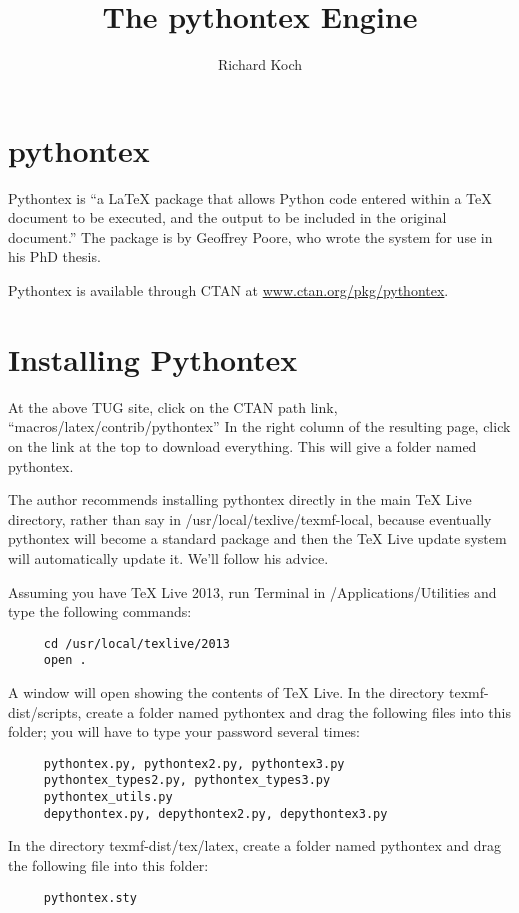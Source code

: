 \documentclass[11pt, oneside]{amsart}
\title{The pythontex Engine}
\author{Richard Koch}
\begin{document}
\maketitle
\vspace{-.3in}
\section{pythontex}
Pythontex is ``a LaTeX package that allows Python code entered within a TeX document to be
executed, and the output to be included in the original document.'' The package is by
Geoffrey Poore, who wrote the system for use in his PhD thesis.

Pythontex is available through CTAN at \href{http://www.ctan.org/pkg/pythontex}{www.ctan.org/pkg/pythontex}. 

\section{Installing Pythontex}

At the above TUG site, click on the CTAN path link, ``macros/latex/contrib/pythontex''
In the right column of the resulting page, click on the link at the top to download everything.
This will give a folder named pythontex.

The author recommends installing pythontex directly in the main TeX Live directory, rather than
say in /usr/local/texlive/texmf-local, because eventually pythontex will become a standard package and then the TeX Live update system will automatically update it. We'll follow
his advice.

Assuming you have TeX Live 2013, run Terminal in /Applications/Utilities and type the following commands:
\begin{verbatim}
     cd /usr/local/texlive/2013
     open .
\end{verbatim}
A window will open showing the contents of TeX Live. In the directory texmf-dist/scripts, create a folder
named pythontex and drag the following files into this folder; you will have to type your password several times:
\begin{verbatim}
     pythontex.py, pythontex2.py, pythontex3.py
     pythontex_types2.py, pythontex_types3.py
     pythontex_utils.py
     depythontex.py, depythontex2.py, depythontex3.py
\end{verbatim}

In the directory texmf-dist/tex/latex, create a folder named pythontex and drag the following file into this folder:
\begin{verbatim}
     pythontex.sty
\end{verbatim}
\end{document}
